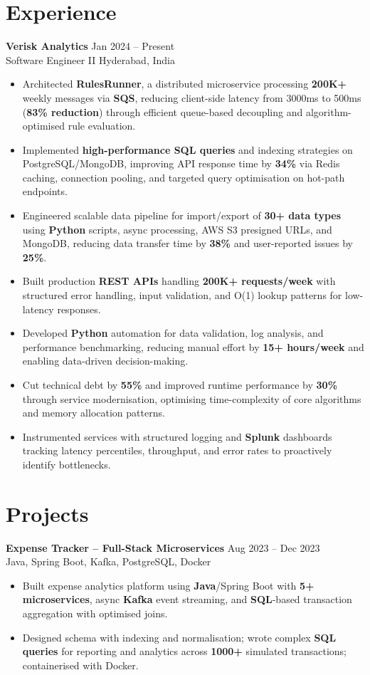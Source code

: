 \documentclass[10pt,letterpaper]{article}
\newcommand{\resumeSubheading}[4]{%
  \textbf{#1} \hfill #2 \\
  #3 \hfill #4 \\
}
\begin{document}
\section*{Experience}
\resumeSubheading{Verisk Analytics}{Jan 2024 -- Present}{Software Engineer II}{Hyderabad, India}
\begin{itemize}
    \item Architected \textbf{RulesRunner}, a distributed microservice processing \textbf{200K+} weekly messages via \textbf{SQS}, reducing client-side latency from 3000ms to 500ms (\textbf{83\% reduction}) through efficient queue-based decoupling and algorithm-optimised rule evaluation.
    \item Implemented \textbf{high-performance SQL queries} and indexing strategies on PostgreSQL/MongoDB, improving API response time by \textbf{34\%} via Redis caching, connection pooling, and targeted query optimisation on hot-path endpoints.
    \item Engineered scalable data pipeline for import/export of \textbf{30+ data types} using \textbf{Python} scripts, async processing, AWS S3 presigned URLs, and MongoDB, reducing data transfer time by \textbf{38\%} and user-reported issues by \textbf{25\%}.
    \item Built production \textbf{REST APIs} handling \textbf{200K+ requests/week} with structured error handling, input validation, and O(1) lookup patterns for low-latency responses.
    \item Developed \textbf{Python} automation for data validation, log analysis, and performance benchmarking, reducing manual effort by \textbf{15+ hours/week} and enabling data-driven decision-making.
    \item Cut technical debt by \textbf{55\%} and improved runtime performance by \textbf{30\%} through service modernisation, optimising time-complexity of core algorithms and memory allocation patterns.
    \item Instrumented services with structured logging and \textbf{Splunk} dashboards tracking latency percentiles, throughput, and error rates to proactively identify bottlenecks.
\end{itemize}

\section*{Projects}
\resumeSubheading{Expense Tracker -- Full-Stack Microservices}{Aug 2023 -- Dec 2023}{}{Java, Spring Boot, Kafka, PostgreSQL, Docker}
\begin{itemize}
    \item Built expense analytics platform using \textbf{Java}/Spring Boot with \textbf{5+ microservices}, async \textbf{Kafka} event streaming, and \textbf{SQL}-based transaction aggregation with optimised joins.
    \item Designed schema with indexing and normalisation; wrote complex \textbf{SQL queries} for reporting and analytics across \textbf{1000+} simulated transactions; containerised with Docker.
\end{itemize}
\end{document}

